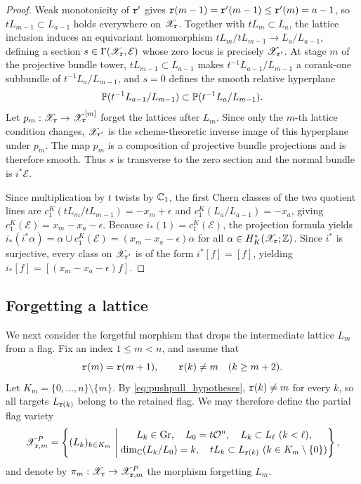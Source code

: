 \begin{proof}
Weak monotonicity of $\mathtt r'$ gives $\mathtt r(m-1)=\mathtt r'(m-1)\leq\mathtt r'(m)=a-1$,
so $tL_{m-1}\subset L_{a-1}$ holds everywhere on $\mathscr X_{\mathtt r}$.
Together with $tL_m\subset L_a$, the lattice inclusion induces an equivariant homomorphism
$tL_m/tL_{m-1}\to L_a/L_{a-1}$, defining a section $s\in\Gamma(\mathscr X_{\mathtt r},\mathcal E)$
whose zero locus is precisely $\mathscr X_{\mathtt r'}$.
At stage $m$ of the projective bundle tower, $tL_{m-1}\subset L_{a-1}$
makes $t^{-1}L_{a-1}/L_{m-1}$ a corank-one subbundle of
$t^{-1}L_a/L_{m-1}$, and $s=0$ defines the smooth relative hyperplane
\[
 \mathbb P(t^{-1}L_{a-1}/L_{m-1})\subset\mathbb P(t^{-1}L_a/L_{m-1}).
\]
Let $p_m:\mathscr X_{\mathtt r}\to\mathscr X_{\mathtt r}^{[m]}$ forget the lattices after $L_m$.
Since only the $m$-th lattice condition changes, $\mathscr X_{\mathtt r'}$ is the
scheme-theoretic inverse image of this hyperplane under $p_m$.
The map $p_m$ is a composition of projective bundle projections and is therefore smooth.
Thus $s$ is transverse to the zero section and the normal bundle is $i^*\mathcal E$.

Since multiplication by $t$ twists by $\mathbb C_1$, the first Chern classes of the two quotient lines are $c_1^K(tL_m/tL_{m-1})=-x_m+\epsilon$ and $c_1^K(L_a/L_{a-1})=-x_a$, giving
$c_1^K(\mathcal E)=x_m-x_a-\epsilon$.
Because $i_*(1)=c_1^K(\mathcal E)$, the projection formula yields $i_*(i^*\alpha)=\alpha\cup c_1^K(\mathcal E)=(x_m-x_a-\epsilon)\alpha$
for all $\alpha\in H_K^*(\mathscr X_{\mathtt r};\mathbb Z)$.
Since $i^*$ is surjective, every class on $\mathscr X_{\mathtt r'}$ is of the form $i^*[f]=[f]$,
yielding $i_*[f]=[(x_m-x_a-\epsilon)f]$.
\end{proof}

\subsection{Forgetting a lattice}

We next consider the forgetful morphism that drops the intermediate lattice $L_m$ from a flag.
Fix an index $1\leq m<n$, and assume that
\begin{equation}\label{eq:pushpull_hypotheses}
  \mathtt r(m)=\mathtt r(m+1),\qquad
  \mathtt r(k)\neq m\quad(k\geq m+2).
\end{equation}
Let $K_m=\{0,\dots,n\}\setminus\{m\}$.
By \eqref{eq:pushpull_hypotheses}, $\mathtt r(k)\neq m$ for every $k$,
so all targets $L_{\mathtt r(k)}$ belong to the retained flag.
We may therefore define the partial flag variety
\[
  \mathscr X_{\mathtt r,m}^P
  =\left\{(L_k)_{k\in K_m}\ \middle|\;
  \begin{gathered}
    L_k\in\mathrm{Gr},\quad L_0=t\mathcal O^n,\quad L_k\subset L_\ell\ (k<\ell),\\
    \dim_\mathbb C(L_k/L_0)=k,\quad
    tL_k\subset L_{\mathtt r(k)}\ (k\in K_m\setminus\{0\})
  \end{gathered}\right\},
\]
and denote by $\pi_m:\mathscr X_{\mathtt r}\to\mathscr X_{\mathtt r,m}^P$ the morphism forgetting $L_m$.

